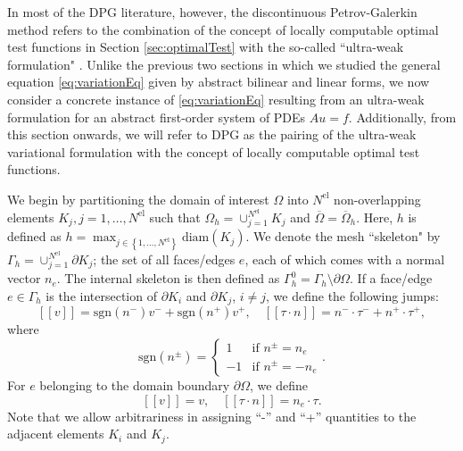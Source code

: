 \documentclass[11pt,onecolumn]{scrartcl}
\newcommand{\eqnref}[1]{\eqref{eq:#1}}
\newcommand{\secref}[1]{\ref{sec:#1}}
\newcommand{\LRp}[1]{\left( #1 \right)}
\newcommand{\LRs}[1]{\left[ #1 \right]}
\newcommand{\LRc}[1]{\left\{ #1 \right\}}
\newcommand{\Nel} {\ensuremath{{N^\text{el}}}}
\newcommand{\jump}[1] {\ensuremath{\LRs{\![#1]\!}}}
\newcommand{\Gh}{\Gamma_h}
\newcommand{\Oh}{\Omega_h}
\begin{document}
In most of the DPG literature, however, the discontinuous Petrov-Galerkin method refers to the combination of the concept of locally computable optimal test functions in Section \secref{optimalTest} with the so-called ``ultra-weak formulation" \cite{DPG1,DPG2,DPG3,DPG4,DPGElas,DBLP:journals/procedia/NiemiCC11}. Unlike the previous two sections in which we studied the general equation \eqnref{variationEq} given by abstract bilinear and linear forms, we now consider a concrete instance of \eqnref{variationEq} resulting from an ultra-weak formulation for an abstract first-order system of PDEs $Au = f$. Additionally, from this section onwards, we will refer to DPG as the pairing of the ultra-weak variational formulation with the concept of locally computable optimal test functions. 

We begin by partitioning the domain of interest $\Omega$ into $\Nel$ non-overlapping elements $K_j, j = 1,\hdots,\Nel$ such that $\Oh = \cup_{j=1}^\Nel K_j$ and $\overline{\Omega} = \overline{\Omega}_h$. Here, $h$ is defined as $h= \max_{j\in \LRc{1,\hdots,\Nel}}\text{diam}\LRp{K_j}$.  We denote the mesh ``skeleton" by $\Gh = \cup_{j=1}^\Nel \partial K_j$; the set of all faces/edges $e$, each of which comes with a normal vector ${n}_e$. The internal skeleton is then defined as $\Gamma^0_h = \Gh \setminus \partial \Omega$. If a face/edge $e \in \Gh$ is the intersection of $\partial K_i$ and $\partial K_j$, $i \ne j$, we define the following jumps:
\[
\jump{v} = \text{sgn} \LRp{{n}^-}v^- + \text{sgn} \LRp{{n}^+}v^+, \quad
\jump{\tau \cdot n} = {n}^-\cdot \tau^- + {n}^+\cdot\tau^+,
\]
where
\[
\text{sgn}\LRp{{n}^{\pm}} =
\left\{
\begin{array}{ll}
1 & \text{if } {n}^{\pm} = {n}_e \\
-1 & \text{if } {n}^\pm = -{n}_e
\end{array}
\right..
\]
For $e$ belonging to the domain boundary $\partial \Omega$, we define
\[
\jump{v} = v, \quad
\jump{\tau \cdot n} = {n}_e\cdot \tau.
\]
Note that we allow arbitrariness in assigning ``-'' and ``+'' quantities to the adjacent elements $K_i$ and $K_j$.
\end{document}
